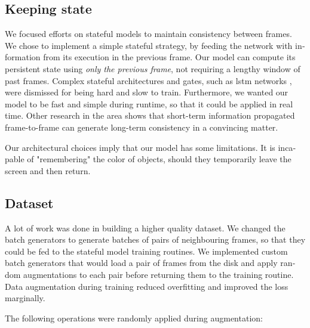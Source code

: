 \documentclass[12pt,openright,oneside,a4paper,english]{abntex2}
\begin{document}
\begin{otherlanguage}{english}
    \subsection{Keeping state}
    \label{keeping_state}

    We focused efforts on stateful models to maintain consistency between frames. We chose to implement a simple stateful strategy, by feeding the network with information from its execution in the previous frame. Our model can compute its persistent state using \textit{only the previous frame}, not requiring a lengthy window of past frames. Complex stateful architectures and gates, such as \acrshort{lstm} networks \cite{lstm}, were dismissed for being hard and slow to train. Furthermore, we wanted our model to be fast and simple during runtime, so that it could be applied in real time. Other research in the area \cite{MSFT_transfer}
    shows that short-term information propagated frame-to-frame can generate long-term consistency in a convincing matter.

    Our architectural choices imply that our model has some limitations. It is incapable of "remembering" the color of objects, should they temporarily leave the screen and then return.

    \subsection{Dataset}

    A lot of work was done in building a higher quality dataset. We changed the batch generators to generate batches of pairs of neighbouring frames, so that they could be fed to the stateful model training routines. We implemented custom batch generators that would load a pair of frames from the disk and apply random augmentations to each pair before returning them to the training routine. Data augmentation during training reduced overfitting and improved the loss marginally.

    The following operations were randomly applied during augmentation:


\end{otherlanguage}
\end{document}
